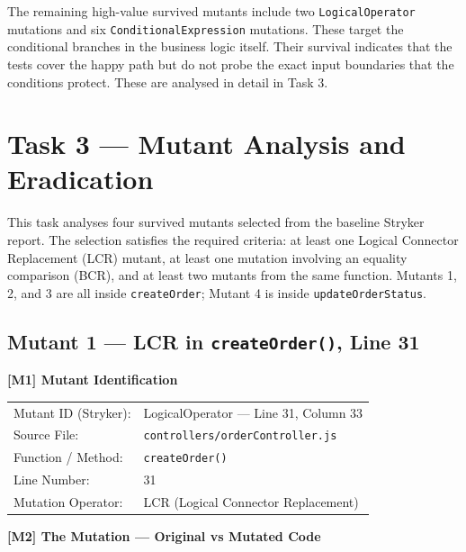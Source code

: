 \documentclass[12pt, a4paper]{article}
\begin{document}
The remaining high-value survived mutants include two \texttt{LogicalOperator} mutations and six \texttt{ConditionalExpression} mutations. These target the conditional branches in the business logic itself. Their survival indicates that the tests cover the happy path but do not probe the exact input boundaries that the conditions protect. These are analysed in detail in Task 3.

\section{Task 3 --- Mutant Analysis and Eradication}

This task analyses four survived mutants selected from the baseline Stryker report. The selection satisfies the required criteria: at least one Logical Connector Replacement (LCR) mutant, at least one mutation involving an equality comparison (BCR), and at least two mutants from the same function. Mutants 1, 2, and 3 are all inside \texttt{createOrder}; Mutant 4 is inside \texttt{updateOrderStatus}.

\bigskip

\subsection*{Mutant 1 --- LCR in \texttt{createOrder()}, Line 31}

\begin{mutantbox}
\textbf{[M1] Mutant Identification}\\[4pt]
\begin{tabular}{ll}
Mutant ID (Stryker):    & LogicalOperator --- Line 31, Column 33 \\
Source File:            & \texttt{controllers/orderController.js} \\
Function / Method:      & \texttt{createOrder()} \\
Line Number:            & 31 \\
Mutation Operator:      & LCR (Logical Connector Replacement) \\
\end{tabular}
\end{mutantbox}

\bigskip

\textbf{[M2] The Mutation --- Original vs Mutated Code}
\end{document}
